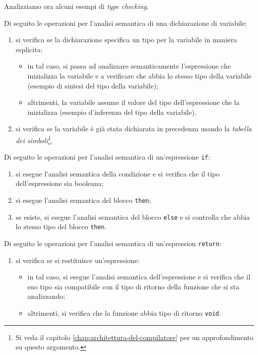 Analizziamo ora alcuni esempi di \emph{type checking}.

Di seguito le operazioni per l'analisi semantica di una dichiarazione di variabile:
\begin{enumerate}
	\item si verifica se la dichiarazione specifica un tipo per la variabile in maniera esplicita:
	\begin{itemize}
		\item in tal caso, si passa ad analizzare semanticamente l'espressione che inizializza la variabile e a verificare che abbia lo stesso tipo della variabile (esempio di sintesi del tipo della variabile);
		\item altrimenti, la variabile assume il valore del tipo dell'espressione che la inizializza (esempio d'inferenza del tipo della variabile).
	\end{itemize}
	\item si verifica se la variabile \`e gi\`a stata dichiarata in precedenza usando la \emph{tabella dei simboli}\footnote{Si veda il capitolo \ref{chap:architettura-del-compilatore} per un approfondimento su questo argomento.}.
\end{enumerate}

Di seguito le operazioni per l'analisi semantica di un'espressione \texttt{if}:
\begin{enumerate}
	\item si esegue l'analisi semantica della condizione e si verifica che il tipo dell'espressione sia booleana;
	\item si esegue l'analisi semantica del blocco \texttt{then};
	\item se esiste, si esegue l'analisi semantica del blocco \texttt{else} e si controlla che abbia lo stesso tipo del blocco \texttt{then}.
\end{enumerate}

Di seguito le operazioni per l'analisi semantica di un'espression \texttt{return}:
\begin{enumerate}
	\item si verifica se si restituisce un'espressione:
	\begin{itemize}
		\item in tal caso, si esegue l'analisi semantica dell'espressione e si verifica che il suo tipo sia compatibile con il tipo di ritorno della funzione che si sta analizzando;
		\item altrimenti, si verifica che la funzione abbia tipo di ritorno \texttt{void}.
	\end{itemize}
\end{enumerate}

